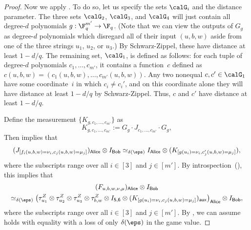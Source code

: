 \documentclass[11pt]{article}
\newcommand{\reg}[1]{{\mathsf{#1}}}
\begin{document}
\begin{proof}
Now we apply .
To do so, let us specify the sets $\calG_i$ and the distance parameter.
The three sets $\calG_2$, $\calG_3$, and $\calG_4$ will just contain all degree-$d$ polynomials $g:\F_q^{m'} \rightarrow \F_q$.
(Note that we can view the outputs of $G_g$ as degree-$d$ polynomials which disregard all of their input $(u, b, w)$ aside from one of the three strings $u_1$, $u_2$, or $u_3$.)
By Schwarz-Zippel, these have distance at least $1-d/q$.
The remaining set, $\calG_1$, is defined as follows:
for each tuple of degree-$d$ polynomials $c_1, \ldots, c_{m'}$,
it contains a function~$c$ defined as $c(u, b, w) = (c_1(u, b, w), \ldots, c_{m'}(u, b, w))$.
Any two nonequal $c, c' \in \calG_1$ have some coordinate~$i$ in which $c_i \neq c_i'$,
and on this coordinate alone they will have distance at least $1-d/q$ by Schwarz-Zippel.
Thus, $c$ and $c'$ have distance at least $1-d/q$.


Define the measurement $\{K_{g, c_1, \ldots, c_{m'}}\}$ as 
\begin{equation*}
K_{g, c_1, \ldots, c_{m'}} := G_g \cdot J_{c_1, \ldots, c_{m'}} \cdot G_g,
\end{equation*}
Then  implies that
\begin{equation*}
(J_{[f_i(u, b, w) = \nu_i, c_j(u, b, w) = \mu_j]})_{\reg{Alice}} \otimes I_{\reg{Bob}} \simeq_{\delta(\eps)} I_{\reg{Alice}} \otimes (K_{[g(u_i) = \nu_i, c_j'(u, b, w) = \mu_j]}),
\end{equation*}
where the subscripts range over all $i \in [3]$ and $j \in [m']$.
By introspection~(), this implies that
\begin{multline}\label{eq:cant-believe-it-but-we-did-it}
(F_{u, b, w, \nu, \mu})_{\reg{Alice}} \otimes I_{\reg{Bob}}\\
\simeq_{\delta(\eps)}
\left(\tau^Z_{u_1} \otimes \tau^Z_{u_2} \otimes \tau^Z_{u_3} \otimes \tau^Z_{b, w}
	\otimes I_{\reg{5,6}} \otimes (K_{[g(u_i) = \nu_i, c_j(u, b, w) = \mu_j]})_{\reg{aux}}\right)_{\reg{Alice}} \otimes I_{\reg{Bob}},
\end{multline}
where the subscripts range over all $i \in [3]$ and $j \in [m']$.
By , we can assume  holds with equality
with a loss of only $\delta(\eps)$ in the game value.


\end{proof}
\end{document}
